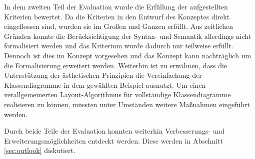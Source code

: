 In dem zweiten Teil der Evaluation wurde die Erfüllung der aufgestellten Kriterien bewertet. Da die Kriterien in den Entwurf des Konzeptes direkt eingeflossen sind, wurden sie im Großen und Ganzen erfüllt. Aus zeitlichen Gründen konnte die Berücksichtigung der Syntax- und Semantik allerdings nicht formalisiert werden und das Kriterium wurde dadurch nur teilweise erfüllt. Dennoch ist dies im Konzept vorgesehen und das Konzept kann nachträglich um die Formalisierung erweitert werden. Weiterhin ist zu erwähnen, dass die Unterstützung der ästhetischen Prinzipien die Vereinfachung der Klassendiagramme in dem gewählten Beispiel ausnutzt. Um einen verallgemeinerten Layout-Algorithmus für vollständige Klassendiagramme realisieren zu können, müssten unter Umständen weitere Maßnahmen eingeführt werden.

Durch beide Teile der Evaluation konnten weiterhin Verbesserungs- und Erweiterungsmöglichkeiten entdeckt werden. Diese werden in Abschnitt \ref{sec:outlook} diskutiert.
